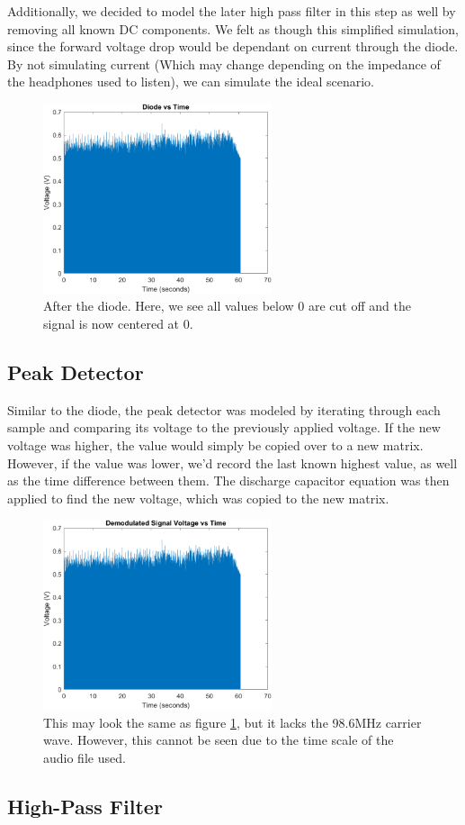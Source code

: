     Additionally, we decided to model the later high pass filter in this step as well by removing all known DC components. We felt as though this simplified simulation, since the forward voltage drop would be dependant on current through the diode. By not simulating current (Which may change depending on the impedance of the headphones used to listen), we can simulate the ideal scenario. 
    \begin{figure}[H]
        \centering
        \includegraphics[width=0.6\textwidth]{Images/Diode Signal.png}
        \caption{After the diode. Here, we see all values below 0 are cut off and the signal is now centered at 0.}
        \label{fig:Diode}
    \end{figure}
\subsection{Peak Detector}
    Similar to the diode, the peak detector was modeled by iterating through each sample and comparing its voltage to the previously applied voltage. If the new voltage was higher, the value would simply be copied over to a new matrix. However, if the value was lower, we'd record the last known highest value, as well as the time difference between them. The discharge capacitor equation was then applied to find the new voltage, which was copied to the new matrix. 
    
    \begin{figure}[H]
        \centering
        \includegraphics[width=0.6\textwidth]{Images/Demodulated Signal.png}
        \caption{This may look the same as figure \ref{fig:Diode}, but it lacks the 98.6MHz carrier wave. However, this cannot be seen due to the time scale of the audio file used.}
        \label{fig:my_label}
    \end{figure}

\subsection{High-Pass Filter}